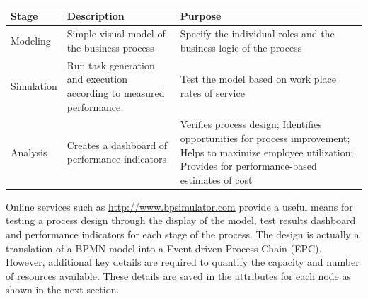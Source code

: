 \documentclass[]{book}
\begin{document}
\begin{longtable}[]{@{}lll@{}}
\toprule
\begin{minipage}[b]{0.22\columnwidth}\raggedright
Stage\strut
\end{minipage} & \begin{minipage}[b]{0.41\columnwidth}\raggedright
Description\strut
\end{minipage} & \begin{minipage}[b]{0.28\columnwidth}\raggedright
Purpose\strut
\end{minipage}\tabularnewline
\midrule
\endhead
\begin{minipage}[t]{0.22\columnwidth}\raggedright
Modeling\strut
\end{minipage} & \begin{minipage}[t]{0.41\columnwidth}\raggedright
Simple visual model of the business process\strut
\end{minipage} & \begin{minipage}[t]{0.28\columnwidth}\raggedright
Specify the individual roles and the business logic of the process\strut
\end{minipage}\tabularnewline
\begin{minipage}[t]{0.22\columnwidth}\raggedright
Simulation\strut
\end{minipage} & \begin{minipage}[t]{0.41\columnwidth}\raggedright
Run task generation and execution according to measured performance\strut
\end{minipage} & \begin{minipage}[t]{0.28\columnwidth}\raggedright
Test the model based on work place rates of service\strut
\end{minipage}\tabularnewline
\begin{minipage}[t]{0.22\columnwidth}\raggedright
Analysis\strut
\end{minipage} & \begin{minipage}[t]{0.41\columnwidth}\raggedright
Creates a dashboard of performance indicators\strut
\end{minipage} & \begin{minipage}[t]{0.28\columnwidth}\raggedright
Verifies process design; Identifies opportunities for process improvement; Helps to maximize employee utilization; Provides for performance-based estimates of cost\strut
\end{minipage}\tabularnewline
\bottomrule
\end{longtable}

Online services such as \url{http://www.bpsimulator.com} provide a useful means for testing a process design through the display of the model, test results dashboard and performance indicators for each stage of the process. The design is actually a translation of a BPMN model into a Event-driven Process Chain (EPC). However, additional key details are required to quantify the capacity and number of resources available. These details are saved in the attributes for each node as shown in the next section.
\end{document}
